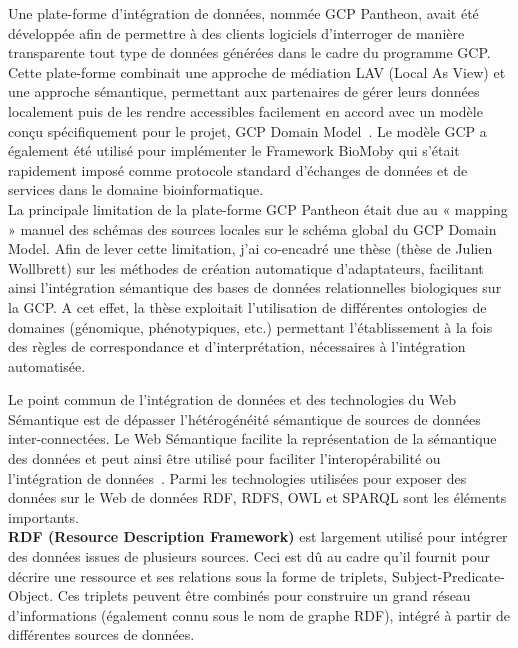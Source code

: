 Une plate-forme d’intégration de données, nommée GCP Pantheon, avait été développée afin de permettre à des clients logiciels d’interroger de manière transparente tout type de données générées dans le cadre du programme GCP. Cette plate-forme combinait une approche de médiation LAV (Local As View) et une approche sémantique, permettant aux partenaires de gérer leurs données localement puis de les rendre accessibles facilement en accord avec un modèle conçu spécifiquement pour le projet, GCP Domain Model~\cite{Bruskiewich2006,Bruskiewich2008}. Le modèle GCP a également été utilisé pour implémenter le Framework BioMoby qui s’était rapidement imposé comme protocole standard d’échanges de données et de services dans le domaine bioinformatique.\\

La principale limitation de la plate-forme GCP Pantheon était due au « mapping » manuel des schémas des sources locales sur le schéma global du GCP Domain Model. Afin de lever cette limitation, j’ai co-encadré une thèse (thèse de Julien Wollbrett) sur les méthodes de création automatique d’adaptateurs, facilitant ainsi l’intégration sémantique des bases de données relationnelles biologiques sur la GCP. A cet effet, la thèse exploitait l’utilisation de différentes ontologies de domaines (génomique, phénotypiques, etc.) permettant l’établissement à la fois des règles de correspondance et d’interprétation, nécessaires à l’intégration automatisée. 

Le point commun de l’intégration de données et des technologies du Web Sémantique est de dépasser l’hétérogénéité sémantique de sources de données inter-connectées. Le Web Sémantique facilite la représentation de la sémantique des données et peut ainsi être utilisé pour faciliter l’interopérabilité ou l’intégration de données~\cite{antezana2009,Jonquet2010}. Parmi les technologies utilisées pour exposer des données sur le Web de données RDF, RDFS, OWL et SPARQL sont les éléments importants.\\

\textbf{RDF (Resource Description Framework)} est largement utilisé pour intégrer des données issues de plusieurs sources. Ceci est dû au cadre qu'il fournit pour décrire une ressource et ses relations sous la forme de triplets, Subject-Predicate-Object. Ces triplets peuvent être combinés pour construire un grand réseau d'informations (également connu sous le nom de graphe RDF), intégré à partir de différentes sources de données. 

